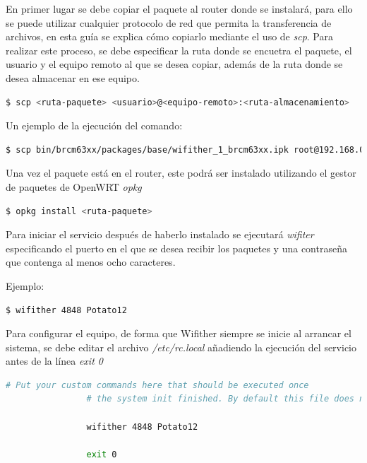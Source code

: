 \documentclass[12pt]{article}
\begin{document}
            En primer lugar se debe copiar el paquete al router donde se instalará, para ello se puede utilizar cualquier protocolo de red que permita la transferencia de archivos, en esta guía se explica cómo copiarlo mediante el uso de \textit{scp}. Para realizar este proceso, se debe especificar la ruta donde se encuetra el paquete, el usuario y el equipo remoto al que se desea copiar, además de la ruta donde se desea almacenar en ese equipo.

            \begin{lstlisting}[language=bash]
                $ scp <ruta-paquete> <usuario>@<equipo-remoto>:<ruta-almacenamiento>
            \end{lstlisting}

            Un ejemplo de la ejecución del comando:
            \begin{lstlisting}[language=bash]
                $ scp bin/brcm63xx/packages/base/wifither_1_brcm63xx.ipk root@192.168.0.4:/root/wifither
            \end{lstlisting}

            Una vez el paquete está en el router, este podrá ser instalado utilizando el gestor de paquetes de OpenWRT \textit{opkg}
            \begin{lstlisting}[language=bash]
                $ opkg install <ruta-paquete>
            \end{lstlisting}

            Para iniciar el servicio después de haberlo instalado se ejecutará \textit{wifiter} especificando el puerto en el que se desea recibir los paquetes y una contraseña que contenga al menos ocho caracteres.

            Ejemplo:
            \begin{lstlisting}[language=bash]
                $ wifither 4848 Potato12
            \end{lstlisting}

            Para configurar el equipo, de forma que Wifither siempre se inicie al arrancar el sistema, se debe editar el archivo \textit{/etc/rc.local} añadiendo la ejecución del servicio antes de la línea \textit{exit 0}

            \begin{lstlisting}[language=bash]
                # Put your custom commands here that should be executed once
                # the system init finished. By default this file does nothing.

                wifither 4848 Potato12

                exit 0
            \end{lstlisting}
\end{document}

